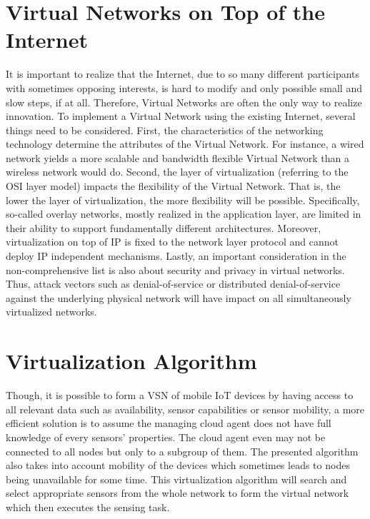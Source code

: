 
\section{Virtual Networks on Top of the Internet}
It is important to realize that the Internet, due to so many different participants with sometimes opposing interests, is hard to modify and only possible small and slow steps, if at all. Therefore, Virtual Networks are often the only way to realize innovation. To implement a Virtual Network using the existing Internet, several things need to be considered. First, the characteristics of the networking technology determine the attributes of the Virtual Network. For instance, a wired network yields a more scalable and bandwidth flexible Virtual Network than a wireless network would do. \cite{Chowdhury} Second, the layer of virtualization (referring to the OSI layer model) impacts the flexibility of the Virtual Network. That is, the lower the layer of virtualization, the more flexibility will be possible. Specifically, so-called overlay networks, mostly realized in the application layer, are limited in their ability to support fundamentally different architectures. \cite{Chowdhury} Moreover, virtualization on top of IP is fixed to the network layer protocol and cannot deploy IP independent mechanisms.  \cite{Chowdhury} Lastly, an important consideration in the non-comprehensive list is also about security and privacy in virtual networks. Thus, attack vectors such as denial-of-service or distributed denial-of-service against the underlying physical network will have impact on all simultaneously virtualized networks.

\section{Virtualization Algorithm}
Though, it is possible to form a VSN of mobile IoT devices by having access to all relevant data such as availability, sensor capabilities or sensor mobility, a more efficient solution is to assume the managing cloud agent does not have full knowledge of every sensors’ properties. \cite{Sherif} The cloud agent even may not be connected to all nodes but only to a subgroup of them. The presented algorithm also takes into account mobility of the devices which sometimes leads to nodes being unavailable for some time. \cite{Sherif}
This virtualization algorithm will search and select appropriate sensors from the whole network to form the virtual network which then executes the sensing task.








